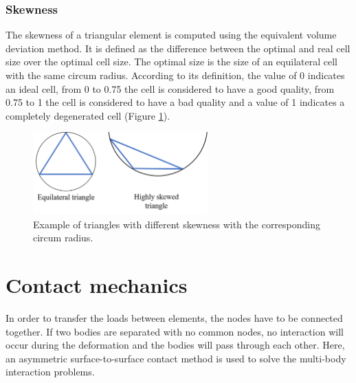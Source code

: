 \subsubsection*{Skewness }
The skewness of a triangular element is computed using the equivalent volume deviation method. It is defined as the difference between the optimal and real cell size over the optimal cell size. The optimal size is the size of an equilateral cell with the same circum radius. According to its definition, the value of 0 indicates an ideal cell, from 0 to 0.75 the cell is considered to have a good quality, from 0.75 to 1 the cell is considered to have a bad quality and a value of 1 indicates a completely degenerated cell (Figure \ref{fig:skewness}).   

 \begin{figure}[!h]
\centering
\includegraphics[width=0.6\textwidth,keepaspectratio]{figures/skewness.png} 
\caption{Example of triangles with different skewness with the corresponding circum radius.}
\label{fig:skewness}
\end{figure}
 
\section{Contact mechanics}\label{section:contactmechanics}

In order to transfer the loads between elements, the nodes have to be connected together. If two bodies are separated with no common nodes, no interaction will occur during the deformation and the bodies will pass through each other. Here, an asymmetric surface-to-surface contact method is used to solve the multi-body interaction problems.

